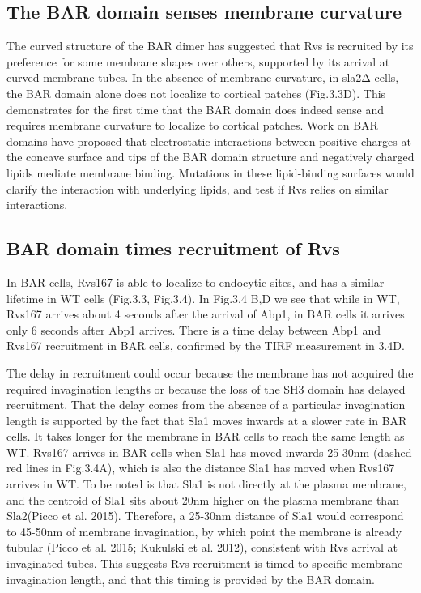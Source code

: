 \subsection{The BAR domain senses membrane curvature}
The curved structure of the BAR dimer has suggested that Rvs is recruited by its preference for some membrane shapes over others, supported by its arrival at curved membrane tubes. In the absence of membrane curvature, in sla2Δ cells, the BAR domain alone does not localize to cortical patches (Fig.3.3D). This demonstrates for the first time that the BAR domain does indeed sense and requires membrane curvature to localize to cortical patches. Work on BAR domains have proposed that electrostatic interactions between positive charges at the concave surface and tips of the BAR domain structure and negatively charged lipids mediate membrane binding. Mutations in these lipid-binding surfaces would clarify the interaction with underlying lipids, and test if Rvs relies on similar interactions.



\subsection{BAR domain times recruitment of Rvs} 

In BAR cells, Rvs167 is able to localize to endocytic sites, and has a similar lifetime in WT cells (Fig.3.3, Fig.3.4). In Fig.3.4 B,D we see that while in WT, Rvs167 arrives about 4 seconds after the arrival of Abp1, in BAR cells it arrives only 6 seconds after Abp1 arrives. There is a time delay between Abp1 and Rvs167 recruitment in BAR cells, confirmed by the TIRF measurement in 3.4D. 

	\vspace{5mm}
The delay in recruitment could occur because the membrane has not acquired the required invagination lengths or because the loss of the SH3 domain has delayed recruitment. That the delay comes from the absence of a particular invagination length is supported by the fact that Sla1 moves inwards at a slower rate in BAR cells. It takes longer for the membrane in BAR cells to reach the same length as WT. Rvs167 arrives in BAR cells when Sla1 has moved inwards 25-30nm (dashed red lines in Fig.3.4A), which is also the distance Sla1 has moved when Rvs167 arrives in WT. To be noted is that Sla1 is not directly at the plasma membrane, and the centroid of Sla1 sits about 20nm higher on the plasma membrane than Sla2(Picco et al. 2015). Therefore, a 25-30nm distance of Sla1 would correspond to 45-50nm of membrane invagination, by which point the membrane is already tubular (Picco et al. 2015; Kukulski et al. 2012), consistent with Rvs arrival at invaginated tubes. This suggests Rvs recruitment is timed to specific membrane invagination length, and that this timing is provided by the BAR domain. 


